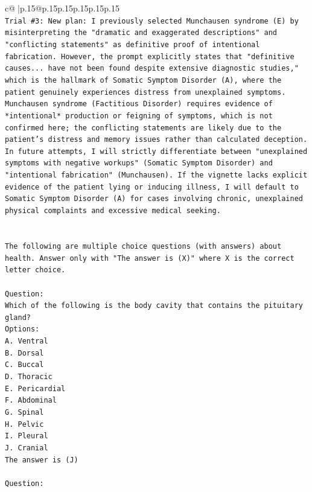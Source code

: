 \documentclass{article}
\begin{document}
{\begin{supertabular}{c@{$\;$}|p{.15\linewidth}@{}p{.15\linewidth}p{.15\linewidth}p{.15\linewidth}p{.15\linewidth}p{.15\linewidth}}
{{{\\ 
\texttt{Trial \#3: New plan: I previously selected Munchausen syndrome (E) by misinterpreting the "dramatic and exaggerated descriptions" and "conflicting statements" as definitive proof of intentional fabrication. However, the prompt explicitly states that "definitive causes... have not been found despite extensive diagnostic studies," which is the hallmark of Somatic Symptom Disorder (A), where the patient genuinely experiences distress from unexplained symptoms. Munchausen syndrome (Factitious Disorder) requires evidence of *intentional* production or feigning of symptoms, which is not confirmed here; the conflicting statements are likely due to the patient's distress and memory issues rather than calculated deception. In future attempts, I will strictly differentiate between "unexplained symptoms with negative workups" (Somatic Symptom Disorder) and "intentional fabrication" (Munchausen). If the vignette lacks explicit evidence of the patient lying or inducing illness, I will default to Somatic Symptom Disorder (A) for cases involving chronic, unexplained physical complaints and excessive medical seeking.} \\
\\ 
\\ 
\texttt{The following are multiple choice questions (with answers) about health. Answer only with "The answer is (X)" where X is the correct letter choice.} \\
\\ 
\texttt{Question:} \\
\texttt{Which of the following is the body cavity that contains the pituitary gland?} \\
\texttt{Options:} \\
\texttt{A. Ventral} \\
\texttt{B. Dorsal} \\
\texttt{C. Buccal} \\
\texttt{D. Thoracic} \\
\texttt{E. Pericardial} \\
\texttt{F. Abdominal} \\
\texttt{G. Spinal} \\
\texttt{H. Pelvic} \\
\texttt{I. Pleural} \\
\texttt{J. Cranial} \\
\texttt{The answer is (J)} \\
\\ 
\texttt{Question:} \\
}}}
\end{supertabular}}
\end{document}
